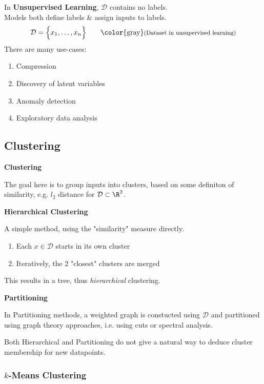 In \textbf{Unsupervised Learning}, $\mathcal{D}$ contains no labels.\\
Models both define labels \& assign inputs to labels.
$$
    \mathcal{D} = \Bigl\{ x_1,\ldots,x_n \Bigr\}    \qquad      \text{\color{gray}\footnotesize(Dataset in unsupervised learning)}
$$
There are many use-cases:
\begin{enumerate}
    \item Compression
    \item Discovery of latent variables
    \item Anomaly detection
    \item Exploratory data analysis
\end{enumerate}

\subsection{Clustering}

 \textbf{Clustering}

The goal here is to group inputs into clusters, based on some definiton of similarity, e.g. $l_2$ distance for $\mathcal{D} \subset \R^2$.\\

\method \textbf{Hierarchical Clustering}

A simple method, using the "similarity" measure directly.

\begin{enumerate}
    \item Each $x \in \mathcal{D}$ starts in its own cluster
    \item Iteratively, the $2$ "closest" clusters are merged
\end{enumerate}

This results in a tree, thus \textit{hierarchical} clustering.

\method \textbf{Partitioning}

In Partitioning methods, a weighted graph is constucted using $\mathcal{D}$ and partitioned using graph theory approaches, i.e. using cuts or spectral analysis.

{\footnotesize
    \remark Both Hierarchical and Partitioning do not give a natural way to deduce cluster membership for new datapoints.
}

\newpage

\subsubsection{$k$-Means Clustering}

